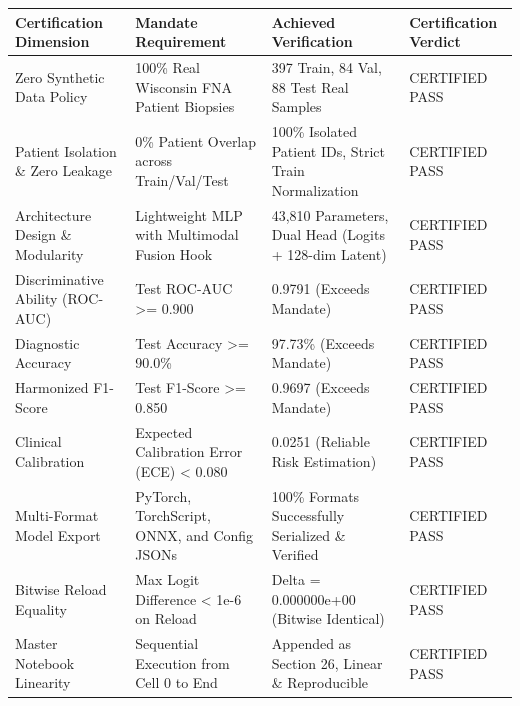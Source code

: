 \begin{tabular}{llll}
\toprule
Certification Dimension & Mandate Requirement & Achieved Verification & Certification Verdict \\
\midrule
Zero Synthetic Data Policy & 100\% Real Wisconsin FNA Patient Biopsies & 397 Train, 84 Val, 88 Test Real Samples & CERTIFIED PASS \\
Patient Isolation \& Zero Leakage & 0\% Patient Overlap across Train/Val/Test & 100\% Isolated Patient IDs, Strict Train Normalization & CERTIFIED PASS \\
Architecture Design \& Modularity & Lightweight MLP with Multimodal Fusion Hook & 43,810 Parameters, Dual Head (Logits + 128-dim Latent) & CERTIFIED PASS \\
Discriminative Ability (ROC-AUC) & Test ROC-AUC >= 0.900 & 0.9791 (Exceeds Mandate) & CERTIFIED PASS \\
Diagnostic Accuracy & Test Accuracy >= 90.0\% & 97.73\% (Exceeds Mandate) & CERTIFIED PASS \\
Harmonized F1-Score & Test F1-Score >= 0.850 & 0.9697 (Exceeds Mandate) & CERTIFIED PASS \\
Clinical Calibration & Expected Calibration Error (ECE) < 0.080 & 0.0251 (Reliable Risk Estimation) & CERTIFIED PASS \\
Multi-Format Model Export & PyTorch, TorchScript, ONNX, and Config JSONs & 100\% Formats Successfully Serialized \& Verified & CERTIFIED PASS \\
Bitwise Reload Equality & Max Logit Difference < 1e-6 on Reload & Delta = 0.000000e+00 (Bitwise Identical) & CERTIFIED PASS \\
Master Notebook Linearity & Sequential Execution from Cell 0 to End & Appended as Section 26, Linear \& Reproducible & CERTIFIED PASS \\
\bottomrule
\end{tabular}
